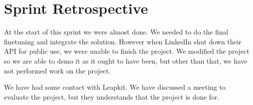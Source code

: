 \section{Sprint Retrospective}

At the start of this sprint we were almost done. We needed to do the final
finetuning and integrate the solution. However when LinkedIn shut down
their API for public use, we were unable to finish the project. We
modified the project so we are able to demo it as it ought to have been,
but other than that, we have not performed work on the project.

We have had some contact with Leapkit. We have discussed a meeting to
evaluate the project, but they understands that the project is done for. 

